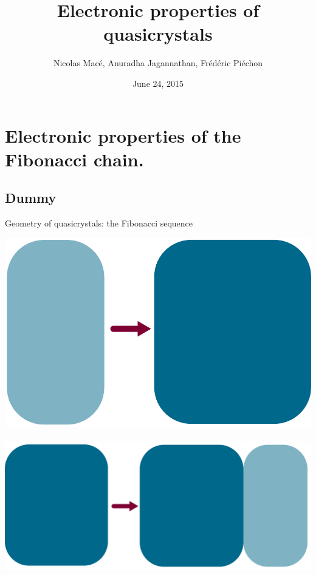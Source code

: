 \documentclass[xcolor=x11names,compress,professionalfonts]{beamer}
\renewcommand{\(}{\begin{columns}}
\renewcommand{\)}{\end{columns}}
\newcommand{\<}[1]{\begin{column}{#1}}
\renewcommand{\>}{\end{column}}
\begin{document}
\begin{frame}
\title{Electronic properties of quasicrystals}
\author{ Nicolas Macé, Anuradha Jagannathan, Frédéric Piéchon }
\date{
	June 24, 2015
}
\titlepage
\end{frame}

\section{Electronic properties of the Fibonacci chain.}
\subsection{Dummy}

\begin{frame}{Geometry of quasicrystals: the Fibonacci sequence}

\newcommand{\s}{.13}
  	\centering
    \includegraphics[scale=\s]{B_A.pdf}~~~~
    \includegraphics[scale=\s]{A_AB.pdf}
    

\end{frame}
\end{document}
